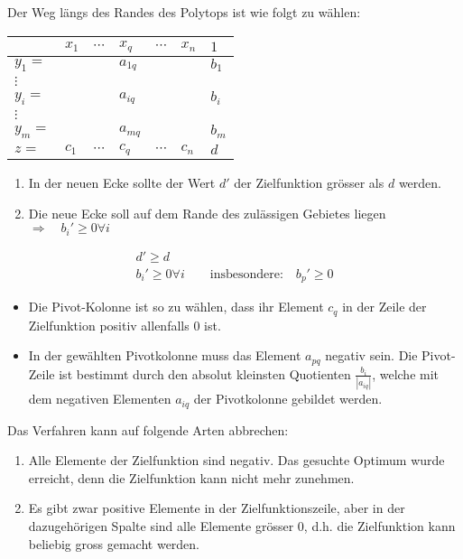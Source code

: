 Der Weg l\"angs des Randes des Polytops ist wie folgt zu w\"ahlen:
\begin{center}
\begin{tabular}{| p{1cm} | p{1cm} p{1cm} p{1.5cm} p{1cm} p{1cm} | p{1cm} |}
\hline
              & $x_1$    & $\cdots$ & $x_q$    & $\cdots$ & $x_n$ & $1$ \\
\hline
$y_1 =$       &          &          & $a_{1q}$ &          &       & $b_1$ \\
$\vdots$      &          &          &          &          &       &       \\
$y_i =$       &          &          & $a_{iq}$ &          &       & $b_i$ \\
$\vdots$      &          &          &          &          &       &       \\
$y_m =$       &          &          & $a_{mq}$ &          &       & $b_m$ \\
\hline
$z =$         & $c_1$    & $\cdots$ & $c_q$    & $\cdots$ & $c_n$ & $d$ \\
\hline
\end{tabular}
\end{center}
\begin{enumerate}
  \item In der neuen Ecke sollte der Wert $d'$ der Zielfunktion gr\"osser als $d$ werden.
  \item Die neue Ecke soll auf dem Rande des zul\"assigen Gebietes liegen $\Longrightarrow\quad b_i' \geq 0 \forall i$
\end{enumerate}
\begin{gather*}
  d' \geq d \\
  b_i' \geq 0 \forall i \qquad\text{insbesondere:}\quad b_p' \geq 0
\end{gather*}

\begin{itemize}
  \item Die Pivot-Kolonne ist so zu w\"ahlen, dass ihr Element $c_q$ in der Zeile der Zielfunktion positiv allenfalls 0 ist.
  \item In der gew\"ahlten Pivotkolonne muss das Element $a_{pq}$ negativ sein. Die Pivot-Zeile ist bestimmt durch den absolut kleinsten Quotienten $\frac{b_i}{|a_{iq}|}$, welche mit dem negativen Elementen $a_{iq}$ der Pivotkolonne gebildet werden.
\end{itemize}

Das Verfahren kann auf folgende Arten abbrechen:
\begin{enumerate}
  \item Alle Elemente der Zielfunktion sind negativ. Das gesuchte Optimum wurde erreicht, denn die Zielfunktion kann nicht mehr zunehmen.
  \item Es gibt zwar positive Elemente in der Zielfunktionszeile, aber in der dazugeh\"origen Spalte sind alle Elemente gr\"osser 0, d.h. die Zielfunktion kann beliebig gross gemacht werden.
\end{enumerate}


